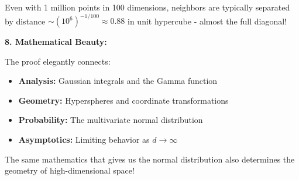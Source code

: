 \documentclass[12pt]{article}
\begin{document}
\begin{explanation}
Even with 1 million points in 100 dimensions, neighbors are typically separated by distance \(\sim (10^6)^{-1/100} \approx 0.88\) in unit hypercube - almost the full diagonal!

\textbf{8. Mathematical Beauty:}

The proof elegantly connects:
\begin{itemize}
    \item \textbf{Analysis:} Gaussian integrals and the Gamma function
    \item \textbf{Geometry:} Hyperspheres and coordinate transformations
    \item \textbf{Probability:} The multivariate normal distribution
    \item \textbf{Asymptotics:} Limiting behavior as \(d \to \infty\)
\end{itemize}

The same mathematics that gives us the normal distribution also determines the geometry of high-dimensional space!
\end{explanation}
\end{document}
